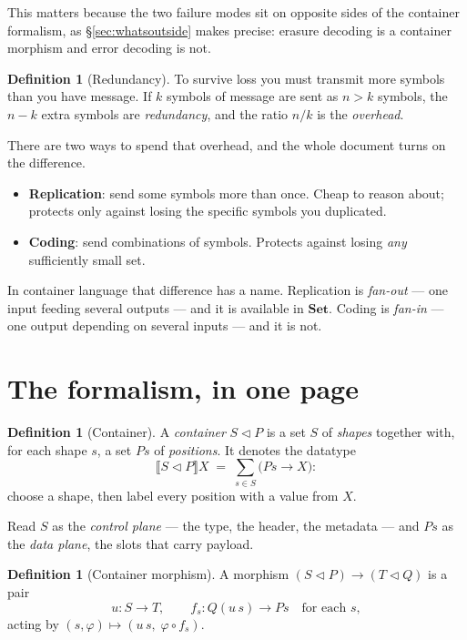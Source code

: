 \documentclass[11pt,a4paper]{article}
\theoremstyle{definition}
\newtheorem{definition}[theorem]{Definition}
\theoremstyle{remark}
\newcommand{\cat}[1]{\mathbf{#1}}
\newcommand{\Set}{\cat{Set}}
\newcommand{\ext}[1]{\llbracket #1 \rrbracket}
\newcommand{\con}{\triangleleft}
\begin{document}
This matters because the two failure modes sit on opposite sides of the container
formalism, as \S\ref{sec:whatsoutside} makes precise: erasure decoding is a container
morphism and error decoding is not.

\begin{definition}[Redundancy]
To survive loss you must transmit more symbols than you have message. If $k$ symbols
of message are sent as $n > k$ symbols, the $n-k$ extra symbols are \emph{redundancy},
and the ratio $n/k$ is the \emph{overhead}.
\end{definition}

There are two ways to spend that overhead, and the whole document turns on the
difference.

\begin{itemize}
  \item \textbf{Replication}: send some symbols more than once. Cheap to reason
        about; protects only against losing the specific symbols you duplicated.
  \item \textbf{Coding}: send combinations of symbols. Protects against losing
        \emph{any} sufficiently small set.
\end{itemize}

In container language that difference has a name. Replication is \emph{fan-out} ---
one input feeding several outputs --- and it is available in $\Set$. Coding is
\emph{fan-in} --- one output depending on several inputs --- and it is not.

\section{The formalism, in one page}

\begin{definition}[Container]
A \emph{container} $S \con P$ is a set $S$ of \emph{shapes} together with, for each
shape $s$, a set $P s$ of \emph{positions}. It denotes the datatype
\[
  \ext{S \con P} X \;=\; \sum_{s \in S} \bigl(P s \to X\bigr):
\]
choose a shape, then label every position with a value from $X$.
\end{definition}

Read $S$ as the \emph{control plane} --- the type, the header, the metadata --- and
$P s$ as the \emph{data plane}, the slots that carry payload.

\begin{definition}[Container morphism]
A morphism $(S \con P) \to (T \con Q)$ is a pair
\[
  u : S \to T,
  \qquad
  f_s : Q(u\,s) \to P s \quad\text{for each } s,
\]
acting by $(s, \varphi) \mapsto (u\,s,\; \varphi \circ f_s)$.
\end{definition}
\end{document}

